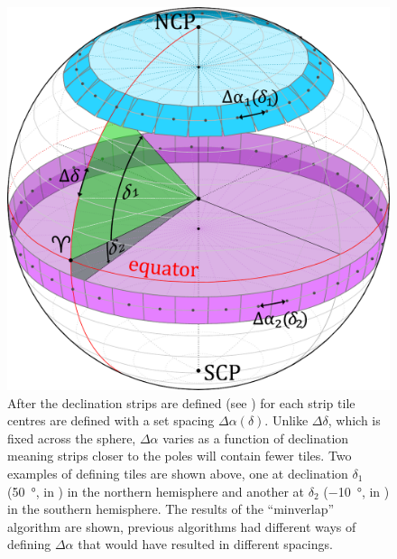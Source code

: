 \begin{colsection}
\begin{colsection}
\begin{figure}[p]
    \begin{center}
        \includegraphics[width=\linewidth]{images/globe3.pdf}
    \end{center}
    \caption[Defining the spacing between tiles]{
        After the declination strips are defined (see ) for each strip tile centres are defined with a set spacing $\Delta\alpha(\delta)$. Unlike $\Delta\delta$, which is fixed across the sphere, $\Delta\alpha$ varies as a function of declination meaning strips closer to the poles will contain fewer tiles. Two examples of defining tiles are shown above, one at declination $\delta_1$ (\SI{50}{\degree}, in ) in the northern hemisphere and another at $\delta_2$ (\SI{-10}{\degree}, in ) in the southern hemisphere. The results of the ``minverlap'' algorithm are shown, previous algorithms had different ways of defining $\Delta\alpha$ that would have resulted in different spacings.
    }\label{fig:deltaalpha}
\end{figure}


\end{colsection}
\end{colsection}
